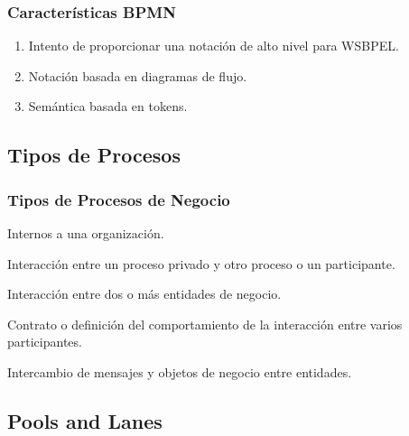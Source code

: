 \documentclass[a4paper,slidestop,xcolor=pst,blue]{beamer}
\begin{document}
\begin{frame}[c]
    \frametitle{Características BPMN}
    \begin{enumerate}[<+->]
        \item Intento de proporcionar una notación de alto nivel para WSBPEL.
        \item Notación basada en diagramas de flujo.
        \item Semántica basada en tokens.
    \end{enumerate}
\end{frame}

\subsection{Tipos de Procesos}

\begin{frame}[c]
    \frametitle{Tipos de Procesos de Negocio}
    \begin{description}[<+->]
        \item[Privados] Internos a una organización.
        \item[Públicos] Interacción entre un proceso privado y otro proceso o un participante.
        \item[Colaboración] Interacción entre dos o más entidades de negocio.
        \item[Coreografías] Contrato o definición del comportamiento de la interacción entre varios participantes.
        \item[Conversaciones] Intercambio de mensajes y objetos de negocio entre entidades.
    \end{description}
\end{frame}


\subsection{Pools and Lanes}
\end{document}
